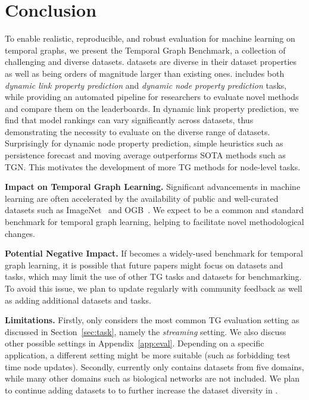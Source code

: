 \section{Conclusion} \label{sec:conclusion}
\vspace{-5pt}
To enable realistic, reproducible, and robust evaluation for machine learning on temporal graphs, we present the Temporal Graph Benchmark, a collection of challenging and diverse datasets. \name datasets are diverse in their dataset properties as well as being orders of magnitude larger than existing ones. \name includes both \emph{dynamic link property prediction} and \emph{dynamic node property prediction} tasks, while providing an automated pipeline for researchers to evaluate novel methods and compare them on the \name leaderboards. 
In dynamic link property prediction, we find that model rankings can vary significantly across datasets, thus demonstrating the necessity to evaluate on the diverse range of \name datasets. Surprisingly for dynamic node property prediction, simple heuristics such as persistence forecast and moving average outperforms SOTA methods such as TGN. This motivates the development of more TG methods for node-level tasks.

\textbf{Impact on Temporal Graph Learning.}
Significant advancements in machine learning are often accelerated by the availability of public and well-curated datasets such as ImageNet~\cite{deng2009imagenet} and OGB~\cite{hu2020open}. We expect \name to be a common and standard benchmark for temporal graph learning, helping to facilitate novel methodological changes. 



\textbf{Potential Negative Impact.}
If \name becomes a widely-used benchmark for temporal graph learning, it is possible that future papers might focus on \name datasets and tasks, which may limit the use of other TG tasks and datasets for benchmarking. To avoid this issue, we plan to update \name regularly with community feedback as well as adding additional datasets and tasks. 


\textbf{Limitations.}
Firstly, \name only considers the most common TG evaluation setting as discussed in Section~\ref{sec:task}, namely the \emph{streaming} setting. We also discuss other possible settings in Appendix~\ref{app:eval}.
Depending on a specific application, a different setting might be more suitable (such as forbidding test time node updates). Secondly, \name currently only contains datasets from five domains, while many other domains such as biological networks are not included. We plan to continue adding datasets to \name to further increase the dataset diversity in \name. 
